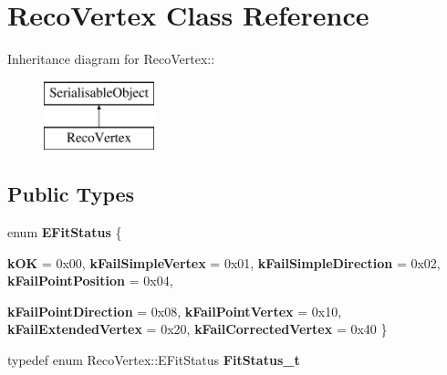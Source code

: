 \hypertarget{classRecoVertex}{
\section{RecoVertex Class Reference}
\label{classRecoVertex}
}
Inheritance diagram for RecoVertex::\begin{figure}[H]
\begin{center}
\leavevmode
\includegraphics[height=2cm]{classRecoVertex}
\end{center}
\end{figure}
\subsection*{Public Types}
\begin{DoxyCompactItemize}
\item 
enum {\bfseries EFitStatus} \{ \par
{\bfseries kOK} =  0x00, 
{\bfseries kFailSimpleVertex} =  0x01, 
{\bfseries kFailSimpleDirection} =  0x02, 
{\bfseries kFailPointPosition} =  0x04, 
\par
{\bfseries kFailPointDirection} =  0x08, 
{\bfseries kFailPointVertex} =  0x10, 
{\bfseries kFailExtendedVertex} =  0x20, 
{\bfseries kFailCorrectedVertex} =  0x40
 \}
\item 
\hypertarget{classRecoVertex_aa3fab4b6250c285ce2d82b3f80ceaf27}{
typedef enum RecoVertex::EFitStatus {\bfseries FitStatus\_\-t}}
\label{classRecoVertex_aa3fab4b6250c285ce2d82b3f80ceaf27}

\end{DoxyCompactItemize}
